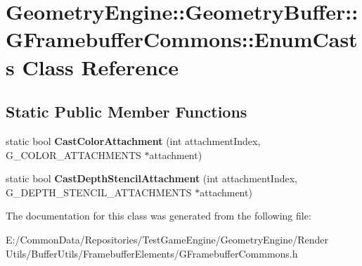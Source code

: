 \hypertarget{class_geometry_engine_1_1_geometry_buffer_1_1_g_framebuffer_commons_1_1_enum_casts}{}\section{Geometry\+Engine\+::Geometry\+Buffer\+::G\+Framebuffer\+Commons\+::Enum\+Casts Class Reference}
\label{class_geometry_engine_1_1_geometry_buffer_1_1_g_framebuffer_commons_1_1_enum_casts}
\subsection*{Static Public Member Functions}
\begin{DoxyCompactItemize}
\item 
\mbox{\label{class_geometry_engine_1_1_geometry_buffer_1_1_g_framebuffer_commons_1_1_enum_casts_a7e38e9bca6e9047b778dcb1f39fed2ed}} 
static bool {\bfseries Cast\+Color\+Attachment} (int attachment\+Index, G\+\_\+\+C\+O\+L\+O\+R\+\_\+\+A\+T\+T\+A\+C\+H\+M\+E\+N\+TS $\ast$attachment)
\item 
\mbox{\label{class_geometry_engine_1_1_geometry_buffer_1_1_g_framebuffer_commons_1_1_enum_casts_a28f8f479e7c0ff9c24789fb1753b6a5c}} 
static bool {\bfseries Cast\+Depth\+Stencil\+Attachment} (int attachment\+Index, G\+\_\+\+D\+E\+P\+T\+H\+\_\+\+S\+T\+E\+N\+C\+I\+L\+\_\+\+A\+T\+T\+A\+C\+H\+M\+E\+N\+TS $\ast$attachment)
\end{DoxyCompactItemize}


The documentation for this class was generated from the following file\+:\begin{DoxyCompactItemize}
\item 
E\+:/\+Common\+Data/\+Repositories/\+Test\+Game\+Engine/\+Geometry\+Engine/\+Render Utils/\+Buffer\+Utils/\+Framebuffer\+Elements/G\+Framebuffer\+Commmons.\+h\end{DoxyCompactItemize}
